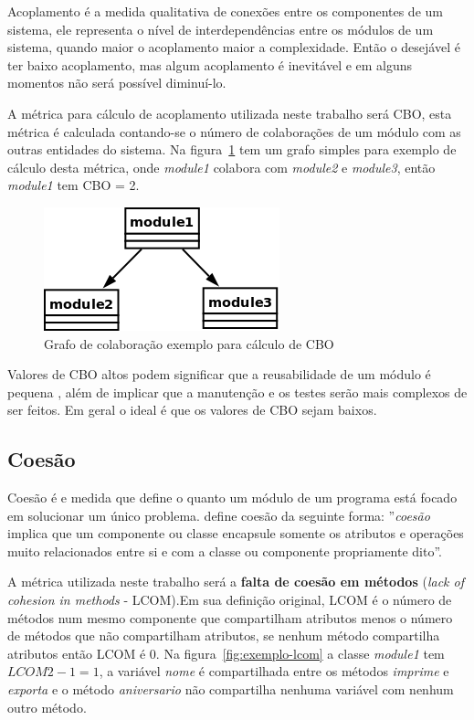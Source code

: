 Acoplamento é a medida qualitativa de conexões entre os componentes de um
sistema, ele representa o nível de interdependências entre os módulos de um
sistema, quando maior o acoplamento maior a complexidade. Então o desejável é
ter baixo acoplamento, mas algum acoplamento é inevitável e em alguns momentos
não será possível diminuí-lo.

A métrica para cálculo de acoplamento utilizada neste trabalho será CBO, esta
métrica é calculada contando-se o número de colaborações de um módulo com as
outras entidades do sistema. Na figura~\ref{fig:exemplo-cbo} tem um grafo
simples para exemplo de cálculo desta métrica, onde {\it module1} colabora com
{\it module2} e {\it module3}, então {\it module1} tem CBO = 2.

\begin{figure}[h]
\center
\includegraphics[scale=0.4]{imagens/exemplo-cbo}
\caption{Grafo de colaboração exemplo para cálculo de CBO}
\label{fig:exemplo-cbo}
\end{figure}

Valores de CBO altos podem significar que a reusabilidade de um módulo é
pequena \cite{engenhariaDeSoftwarePressman}, além de implicar que a manutenção
e os testes serão mais complexos de ser feitos. Em geral o ideal é que os
valores de CBO sejam baixos.

\subsection{Coesão}

Coesão é e medida que define o quanto um módulo de um programa está focado em
solucionar um único problema.  define
coesão da seguinte forma: ''{\it coesão} implica que um componente ou classe
encapsule somente os atributos e operações muito relacionados entre si e com a
classe ou componente propriamente dito''.

A métrica utilizada neste trabalho será a {\bf falta de coesão em métodos}
({\it lack of cohesion in methods} - LCOM).Em sua definição original, LCOM é
o número de métodos num mesmo componente que compartilham atributos menos o
número de métodos que não compartilham atributos, se nenhum método compartilha
atributos então LCOM é 0. Na figura~\ref{fig:exemplo-lcom} a classe {\it
module1} tem $LCOM 2 - 1 = 1$, a variável {\it nome} é compartilhada entre
os métodos {\it imprime} e {\it exporta} e o método {\it aniversario} não
compartilha nenhuma variável com nenhum outro método.

